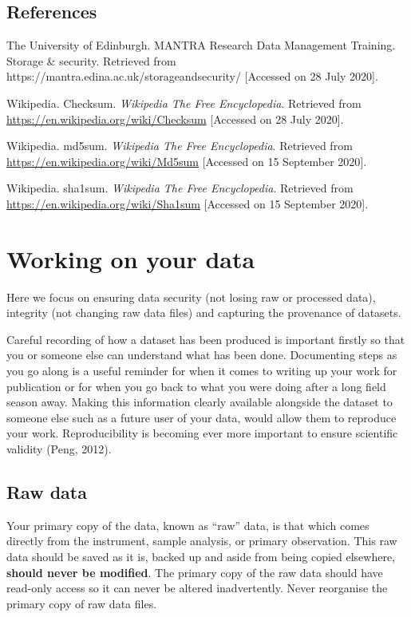 \documentclass[a4paper,oneside]{report}
\begin{document}
\hypertarget{references-4}{%
\section{References}\label{references-4}}

The University of Edinburgh. MANTRA Research Data Management Training.
Storage \& security. Retrieved from
https://mantra.edina.ac.uk/storageandsecurity/ {[}Accessed on 28 July
2020{]}.

Wikipedia. Checksum. \emph{Wikipedia The Free Encyclopedia}. Retrieved
from \url{https://en.wikipedia.org/wiki/Checksum} {[}Accessed on 28 July
2020{]}.

Wikipedia. md5sum. \emph{Wikipedia The Free Encyclopedia}. Retrieved
from \url{https://en.wikipedia.org/wiki/Md5sum} {[}Accessed on 15
September 2020{]}.

Wikipedia. sha1sum. \emph{Wikipedia The Free Encyclopedia}. Retrieved
from \url{https://en.wikipedia.org/wiki/Sha1sum} {[}Accessed on 15
September 2020{]}.

\hypertarget{working-on-your-data}{%
\chapter{Working on your data}\label{working-on-your-data}}

Here we focus on ensuring data security (not losing raw or processed
data), integrity (not changing raw data files) and capturing the
provenance of datasets.

Careful recording of how a dataset has been produced is important
firstly so that you or someone else can understand what has been done.
Documenting steps as you go along is a useful reminder for when it comes
to writing up your work for publication or for when you go back to what
you were doing after a long field season away. Making this information
clearly available alongside the dataset to someone else such as a future
user of your data, would allow them to reproduce your work.
Reproducibility is becoming ever more important to ensure scientific
validity (Peng, 2012).

\hypertarget{raw-data}{%
\section{Raw data}\label{raw-data}}

Your primary copy of the data, known as ``raw'' data, is that which
comes directly from the instrument, sample analysis, or primary
observation. This raw data should be saved as it is, backed up and aside
from being copied elsewhere, \textbf{should never be modified}. The
primary copy of the raw data should have read-only access so it can
never be altered inadvertently. Never reorganise the primary copy of raw
data files.
\end{document}
